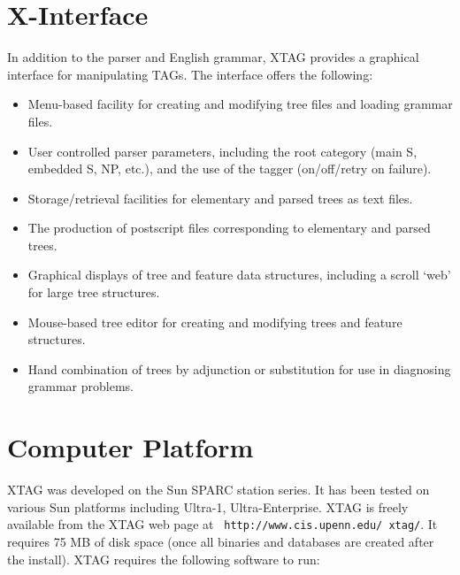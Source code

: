 {\section{X-Interface}

In addition to the parser and English grammar, XTAG provides a graphical
interface for manipulating TAGs.  The interface offers the following:

\begin{itemize}

\item Menu-based facility for creating and modifying tree files and 
loading grammar files.

\item User controlled parser parameters, including the root
category (main S, embedded S, NP, etc.), and the use of the tagger
(on/off/retry on failure).

\item Storage/retrieval facilities for elementary and parsed trees as
text files.

\item The production of postscript files corresponding to elementary
and parsed trees.

\item Graphical displays of tree and feature data structures,
including a scroll `web' for large tree structures.

\item Mouse-based tree editor for creating and modifying trees and
feature structures.

\item Hand combination of trees by adjunction or substitution for use
in diagnosing grammar problems.

\end{itemize}


\section{Computer Platform}


XTAG was developed on the Sun SPARC station series. It has been tested
on various Sun platforms including Ultra-1, Ultra-Enterprise. XTAG is
freely available from the XTAG web page at {\tt
  http://www.cis.upenn.edu/~xtag/}. It requires 75 MB of disk space
(once all binaries and databases are created after the install). XTAG
requires the following software to run:

\begin{itemize}
  

\end{itemize}}
